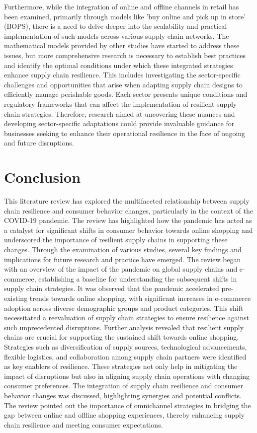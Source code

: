 Furthermore, while the integration of online and offline channels in retail has been examined, primarily through models like 'buy online and pick up in store' (BOPS), there is a need to delve deeper into the scalability and practical implementation of such models across various supply chain networks. The mathematical models provided by other studies have started to address these issues, but more comprehensive research is necessary to establish best practices and identify the optimal conditions under which these integrated strategies enhance supply chain resilience. This includes investigating the sector-specific challenges and opportunities that arise when adapting supply chain designs to efficiently manage perishable goods. Each sector presents unique conditions and regulatory frameworks that can affect the implementation of resilient supply chain strategies. Therefore, research aimed at uncovering these nuances and developing sector-specific adaptations could provide invaluable guidance for businesses seeking to enhance their operational resilience in the face of ongoing and future disruptions.

\section{Conclusion}

This literature review has explored the multifaceted relationship between supply chain resilience and consumer behavior changes, particularly in the context of the COVID-19 pandemic. The review has highlighted how the pandemic has acted as a catalyst for significant shifts in consumer behavior towards online shopping and underscored the importance of resilient supply chains in supporting these changes. Through the examination of various studies, several key findings and implications for future research and practice have emerged. The review began with an overview of the impact of the pandemic on global supply chains and e-commerce, establishing a baseline for understanding the subsequent shifts in supply chain strategies. It was observed that the pandemic accelerated pre-existing trends towards online shopping, with significant increases in e-commerce adoption across diverse demographic groups and product categories. This shift necessitated a reevaluation of supply chain strategies to ensure resilience against such unprecedented disruptions. Further analysis revealed that resilient supply chains are crucial for supporting the sustained shift towards online shopping. Strategies such as diversification of supply sources, technological advancements, flexible logistics, and collaboration among supply chain partners were identified as key enablers of resilience. These strategies not only help in mitigating the impact of disruptions but also in aligning supply chain operations with changing consumer preferences. The integration of supply chain resilience and consumer behavior changes was discussed, highlighting synergies and potential conflicts. The review pointed out the importance of omnichannel strategies in bridging the gap between online and offline shopping experiences, thereby enhancing supply chain resilience and meeting consumer expectations.



